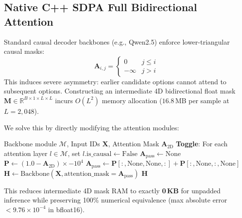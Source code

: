 \documentclass[11pt,a4paper]{article}
\begin{document}
\subsection{Native C++ SDPA Full Bidirectional Attention}
Standard causal decoder backbones (e.g., Qwen2.5) enforce lower-triangular causal masks:
\begin{equation}
\mathbf{A}_{i, j} = \begin{cases} 0 & j \le i \\ -\infty & j > i \end{cases}
\end{equation}
This induces severe asymmetry: earlier candidate options cannot attend to subsequent options. Constructing an intermediate 4D bidirectional float mask $\mathbf{M} \in \mathbb{R}^{B \times 1 \times L \times L}$ incurs $O(L^2)$ memory allocation ($16.8$\,MB per sample at $L=2,048$).

We solve this by directly modifying the attention modules:
\begin{algorithm}[H]
\caption{Zero-Memory Fast Bidirectional SDPA}
\begin{algorithmic}[1]
\REQUIRE Backbone module $\mathcal{M}$, Input IDs $\mathbf{X}$, Attention Mask $\mathbf{A}_{\text{2D}}$
\STATE \textbf{Toggle}: For each attention layer $l \in \mathcal{M}$, set $l\text{.is\_causal} \leftarrow \text{False}$
    \STATE $\mathbf{A}_{\text{pass}} \leftarrow \text{None}$ 
\ELSE
    \STATE $\mathbf{P} \leftarrow (1.0 - \mathbf{A}_{\text{2D}}) \times -10^4$
    \STATE $\mathbf{A}_{\text{pass}} \leftarrow \mathbf{P}[:, \text{None}, \text{None}, :] + \mathbf{P}[:, \text{None}, :, \text{None}]$ 
\ENDIF
\STATE $\mathbf{H} \leftarrow \text{Backbone}(\mathbf{X}, \text{attention\_mask}=\mathbf{A}_{\text{pass}})$
\RETURN $\mathbf{H}$
\end{algorithmic}
\end{algorithm}
This reduces intermediate 4D mask RAM to exactly \textbf{0\,KB} for unpadded inference while preserving 100\% numerical equivalence (max absolute error $< 9.76 \times 10^{-4}$ in bfloat16).
\end{document}
